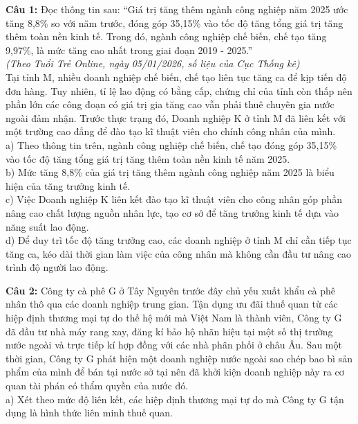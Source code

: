 \documentclass[12pt,a4paper]{article}
\begin{document}
\noindent \textbf{Câu 1:} Đọc thông tin sau: ``Giá trị tăng thêm ngành công nghiệp năm 2025 ước tăng 8,8\% so với năm trước, đóng góp 35,15\% vào tốc độ tăng tổng giá trị tăng thêm toàn nền kinh tế. Trong đó, ngành công nghiệp chế biến, chế tạo tăng 9,97\%, là mức tăng cao nhất trong giai đoạn 2019 - 2025.''\\
\hspace*{\fill}\textit{(Theo Tuổi Trẻ Online, ngày 05/01/2026, số liệu của Cục Thống kê)}\\
Tại tỉnh M, nhiều doanh nghiệp chế biến, chế tạo liên tục tăng ca để kịp tiến độ đơn hàng. Tuy nhiên, tỉ lệ lao động có bằng cấp, chứng chỉ của tỉnh còn thấp nên phần lớn các công đoạn có giá trị gia tăng cao vẫn phải thuê chuyên gia nước ngoài đảm nhận. Trước thực trạng đó, Doanh nghiệp K ở tỉnh M đã liên kết với một trường cao đẳng để đào tạo kĩ thuật viên cho chính công nhân của mình.\\
\noindent a) Theo thông tin trên, ngành công nghiệp chế biến, chế tạo đóng góp 35,15\% vào tốc độ tăng tổng giá trị tăng thêm toàn nền kinh tế năm 2025.\\


\noindent b) Mức tăng 8,8\% của giá trị tăng thêm ngành công nghiệp năm 2025 là biểu hiện của tăng trưởng kinh tế.\\


\noindent c) Việc Doanh nghiệp K liên kết đào tạo kĩ thuật viên cho công nhân góp phần nâng cao chất lượng nguồn nhân lực, tạo cơ sở để tăng trưởng kinh tế dựa vào năng suất lao động.\\


\noindent d) Để duy trì tốc độ tăng trưởng cao, các doanh nghiệp ở tỉnh M chỉ cần tiếp tục tăng ca, kéo dài thời gian làm việc của công nhân mà không cần đầu tư nâng cao trình độ người lao động.

\noindent \textbf{Câu 2:} Công ty cà phê G ở Tây Nguyên trước đây chủ yếu xuất khẩu cà phê nhân thô qua các doanh nghiệp trung gian. Tận dụng ưu đãi thuế quan từ các hiệp định thương mại tự do thế hệ mới mà Việt Nam là thành viên, Công ty G đã đầu tư nhà máy rang xay, đăng kí bảo hộ nhãn hiệu tại một số thị trường nước ngoài và trực tiếp kí hợp đồng với các nhà phân phối ở châu Âu. Sau một thời gian, Công ty G phát hiện một doanh nghiệp nước ngoài sao chép bao bì sản phẩm của mình để bán tại nước sở tại nên đã khởi kiện doanh nghiệp này ra cơ quan tài phán có thẩm quyền của nước đó.\\
\noindent a) Xét theo mức độ liên kết, các hiệp định thương mại tự do mà Công ty G tận dụng là hình thức liên minh thuế quan.\\
\end{document}
